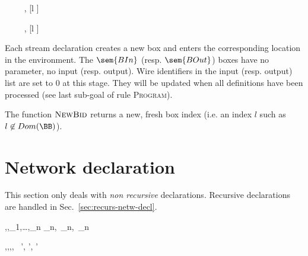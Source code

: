 {\TE \vdash {}~~\ty~~ , [l
  \mapsto {}]}

{\TE \vdash {}~~\ty~~ , [l
  \mapsto {}]}

\medskip Each stream declaration creates a new box and enters the corresponding location in the
environment.  The $\sem{BIn}$ (resp. $\sem{BOut}$) boxes have no parameter, no input (resp. output).
Wire identifiers in the input (resp.  output) list are set to 0 at
this stage. They will be updated when all definitions have been processed (see last sub-goal of rule
\textsc{Program}).

The function $\textsc{NewBid}$ returns a new, fresh box index (i.e. an index $l$ such as $l \not\in Dom(\BB)$).

\section{Network declaration}
\label{sec:static-network-declarations}

This section only deals with \emph{non recursive} declarations. Recursive declarations are handled
in Sec.~\ref{sec:recurs-netw-decl}.


{\TE,\EE,\NE \vdash {}_1,\ldots,_n \gives \NE_n,~\BB_n,~\WW_n}


{\TE,\EE,\NE,\BB,\WW \vdash {}~  \gives \NE \oplus \NE', \BB \oplus \BB', \WW \oplus
  \WW'}



